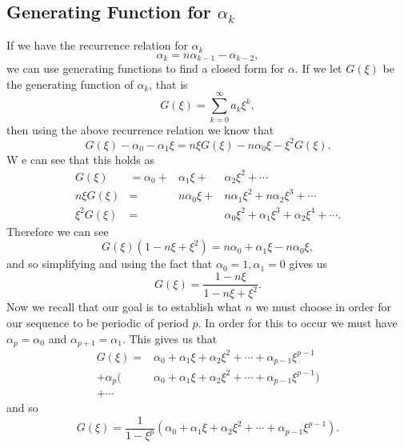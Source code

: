 \documentclass[12pt]{article}
\begin{document}
\subsection{Generating Function for $\alpha_k$}
If we have the recurrence relation for $\alpha_k$ 
\begin{equation*}
\alpha_k = n \alpha_{k-1} - \alpha_{k-2}, 
\end{equation*}
we can use generating functions to find a closed form for $\alpha$. If we let $G(\xi)$ be the generating function of $\alpha_k$, that is 
\begin{equation*}
G(\xi) = \sum_{k=0}^{\infty} a_k \xi^k,
\end{equation*}
then using the above recurrence relation we know that 
\begin{equation*}
G(\xi) -\alpha_0 - \alpha_1 \xi = n \xi G(\xi) - n \alpha_0 \xi - \xi^2 G(\xi).
\end{equation*}
W e can see that this holds as 
\begin{align*}
G(\xi) &= \alpha_0 + &\alpha_1 \xi + &\alpha_2 \xi^2 + \cdots \\
n \xi G(\xi) &= &n\alpha_0 \xi + &n\alpha_1 \xi^2 + n\alpha_2 \xi^3 + \cdots \\
\xi^2 G(\xi) &= &&\alpha_0 \xi^2 + \alpha_1 \xi^3 + \alpha_2 \xi^4 + \cdots.
\end{align*}
Therefore we can see 
\begin{equation*}
G( \xi) (1-n \xi + \xi^2) = n\alpha_0 + \alpha_1 \xi - n\alpha_0 \xi,
\end{equation*}
and so simplifying and using the fact that $\alpha_0=1, \alpha_1=0$ gives us 
\begin{equation*}
G(\xi) = \frac{ 1 - n\xi}{1 - n \xi + \xi^2} .
\end{equation*}
Now we recall that our goal is to establish what $n$ we must choose in order for our sequence to be periodic of period $p$. In order for this to occur we must have $\alpha_p= \alpha_0$ and $\alpha_{p+1} = \alpha_1$. This gives us that 
\begin{align*}
G(\xi) = &\alpha_0 + \alpha_1 \xi + \alpha_2 \xi^2 + \cdots + \alpha_{p-1} \xi^{p-1} \\
+ \alpha_p(&\alpha_0 + \alpha_1 \xi + \alpha_2 \xi^2 + \cdots + \alpha_{p-1} \xi^{p-1}) \\ 
+ \cdots 
\end{align*}
and so 
\begin{equation*}
G(\xi) = \frac{1}{1- \xi^p} (\alpha_0 + \alpha_1 \xi + \alpha_2 \xi^2 + \cdots + \alpha_{p-1} \xi^{p-1}).
\end{equation*}
\end{document}
